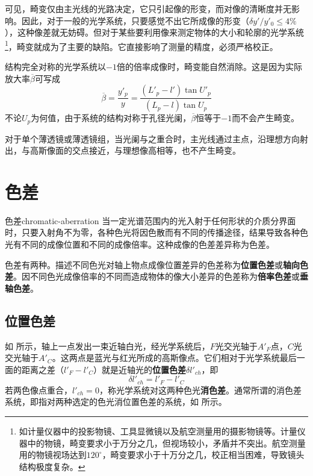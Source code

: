 \documentclass[cn,10pt,chinesefont=founder,math=mtpro2,cite=super,toc=onecol,twoside,openany]{elegantbook}
\begin{document}
可见，畸变仅由主光线的光路决定，它只引起像的形变，而对像的清晰度并无影响。因此，对于一般的光学系统，只要感觉不出它所成像的形变（$\delta y'/y'_0\leqslant 4\%$），这种像差就无妨碍。但对于某些要利用像来测定物体的大小和轮廓的光学系统\footnote{如计量仪器中的投影物镜、工具显微镜以及航空测量用的摄影物镜等。计量仪器中的物镜，畸变要求小于万分之几，但视场较小，矛盾并不突出。航空测量用的物镜视场达到$120^{\circ}$，畸变要求小于十万分之几，校正相当困难，导致镜头结构极度复杂。}，畸变就成为了主要的缺陷。它直接影响了测量的精度，必须严格校正。

结构完全对称的光学系统以$-1$倍的倍率成像时，畸变能自然消除。这是因为实际放大率$\overline{\beta}$可写成
\begin{equation}
\overline{\beta}=\frac{y'_p}{y}=\frac{(L'_p-l')\tan U'_p}{(L_p-l)\tan U_p}
\end{equation}
不论$U_p$为何值，由于系统的结构对称于孔径光阑，$\overline{\beta}$恒等于$-1$而不会产生畸变。

对于单个薄透镜或薄透镜组，当光阑与之重合时，主光线通过主点，沿理想方向射出，与高斯像面的交点接近，与理想像高相等，也不产生畸变。


\section{色差}
\label{sect:chromatic-aberration}
\begin{definition}{色差}{chromatic-aberration}
	当一定光谱范围内的光入射于任何形状的介质分界面时，只要入射角不为零，各种色光将因色散而有不同的传播途径，结果导致各种色光有不同的成像位置和不同的成像倍率。这种成像的色差差异称为色差。
\end{definition}

色差有两种。描述不同色光对轴上物点成像位置差异的色差称为\textbf{位置色差}或\textbf{轴向色差}。因不同色光成像倍率的不同而造成物体的像大小差异的色差称为\textbf{倍率色差}或\textbf{垂轴色差}。

\subsection{位置色差}

如 所示，轴上一点发出一束近轴白光，经光学系统后，$F$光交光轴于$A'_F$点，$C$光交光轴于$A'_C$。这两点是蓝光与红光所成的高斯像点。它们相对于光学系统最后一面的距离之差（$l'_F-l'_C$）就是近轴光的\textbf{位置色差}$\delta l'_{ch}$，即
\begin{equation}
\delta l'_{ch}=l'_F-l'_C
\end{equation}
若两色像点重合，$l'_{ch}=0$，称光学系统对这两种色光\textbf{消色差}。通常所谓的消色差系统，即指对两种选定的色光消位置色差的系统，如 所示。
\end{document}
